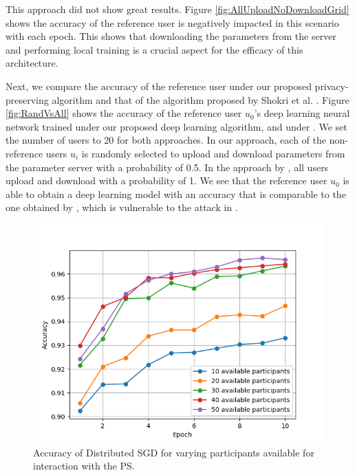 \documentclass[conference]{IEEEtran}
\begin{document}
This approach did not show great results. Figure \ref{fig:AllUploadNoDownloadGrid} shows the accuracy of the reference user is negatively impacted in this scenario with each epoch. This shows that downloading the parameters from the server and performing local training is a crucial aspect for the efficacy of this architecture.

Next, we compare the accuracy of the reference user under our proposed privacy-preserving algorithm and that of the algorithm proposed
by Shokri et al. \cite{shokri2015privacy}. Figure \ref{fig:RandVsAll} shows the accuracy of the reference user $u_0$'s deep learning
neural network trained under our proposed deep learning algorithm, and under \cite{shokri2015privacy}. We set the number of
users to 20 for both approaches. In our approach, each of the non-reference users $u_i$ is randomly
selected to upload and download parameters from the parameter server with a probability of 0.5. 
In the approach by \cite{shokri2015privacy}, all users upload and download with a probability of 1. 
We see that the reference user $u_0$ is able to obtain a deep learning model with an accuracy that is comparable to the one
obtained by \cite{shokri2015privacy}, which is vulnerable to the attack in \cite{hitaj2017deep}. 

\begin{figure}[!h]
\centering
\includegraphics[width=\columnwidth, keepaspectratio]{VaryingPoolofParticipantsGrid}
\caption{Accuracy of Distributed SGD for varying participants available for interaction with the PS.}
\label{fig:VaryingPoolofParticipants}
\end{figure}
\end{document}
